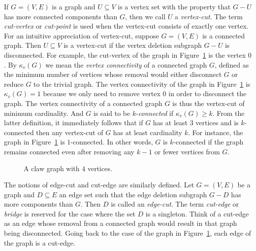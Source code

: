 If $G = (V,E)$ is a graph and $U \subseteq V$ is a vertex set with the
property that $G - U$ has more connected components than $G$, then we
call $U$ a \emph{vertex-cut}. The term
\emph{cut-vertex} or
\emph{cut-point} is used when the vertex-cut consists
of exactly one vertex. For an intuitive appreciation of vertex-cut,
suppose $G = (V,E)$ is a connected graph. Then $U \subseteq V$ is a
vertex-cut if the vertex deletion
subgraph $G - U$ is disconnected. For example, the cut-vertex of the
graph in Figure~\ref{fig:distance_connectivity:claw_graph} is the
vertex $0$. By $\kappa_v(G)$ we mean the
\emph{vertex connectivity} of a connected
graph $G$, defined as the minimum number of vertices whose removal
would either disconnect $G$ or reduce $G$ to the trivial graph. The
vertex connectivity of the graph in
Figure~\ref{fig:distance_connectivity:claw_graph} is
$\kappa_v(G) = 1$ because we only need to remove vertex $0$ in order
to disconnect the graph. The vertex connectivity of a connected graph
$G$ is thus the vertex-cut of minimum cardinality. And $G$ is said to
be $k$-\emph{connected} if $\kappa_v(G) \geq k$. From the latter
definition, it immediately follows that if $G$ has at least $3$
vertices and is $k$-connected then any vertex-cut of $G$ has at least
cardinality $k$. For instance, the graph in
Figure~\ref{fig:distance_connectivity:claw_graph} is $1$-connected. In
other words, $G$ is $k$-connected if the graph remains connected even
after removing any $k - 1$ or fewer vertices from $G$.

\begin{figure}[!htbp]
\centering
{}

\caption{A claw graph with $4$ vertices.}
\label{fig:distance_connectivity:claw_graph}
\end{figure}

The notions of edge-cut and cut-edge are similarly defined. Let
$G = (V,E)$ be a graph and $D \subseteq E$ an edge set such that the
edge deletion subgraph $G - D$ has more components than $G$. Then $D$
is called an \emph{edge-cut}. The term
\emph{cut-edge} or \emph{bridge} is
reserved for the case where the set $D$ is a singleton. Think of a
cut-edge as an edge whose removal from a connected graph would result
in that graph being disconnected. Going back to the case of the graph
in Figure~\ref{fig:distance_connectivity:claw_graph}, each edge of the
graph is a cut-edge.

